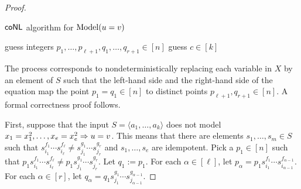 \documentclass{amsart}
\newcommand{\Model}{\mathrm{Model}}
\newcommand{\eq}{\ensuremath\mathrel{=}}
\newcommand{\NL}{\ensuremath\mathsf{NL}}
\newcommand{\co}{\ensuremath\mathsf{co}}
\theoremstyle{remark}
\numberwithin{equation}{section}
\begin{document}
\begin{proof}
  \begin{algorithm}
  \caption{$\co\NL$ algorithm for $\Model(u \eq v)$}
    \label{alg:models}
    \begin{algorithmic}[1]
      \Output{Does $\langle a_1,\dots,a_k,a_1^{-1},\dots,a_k^{-1} \rangle$ \emph{not} model $u \eq v$?}
      \State guess integers $p_1, \dots, p_{\ell+1}, q_1, \dots, q_{r+1} \in [n]$
        \Repeat
          \State guess $c \in [k]$
      \EndFor
      \State\Accept
    \end{algorithmic}
  \end{algorithm}

  The process corresponds to nondeterministically replacing each variable
  in $X$ by an element of $S$ such that the left-hand side and the right-hand
  side of the equation map the point $p_1 = q_1 \in [n]$ to distinct points $p_{\ell+1}, q_{r+1} \in [n]$. A formal correctness proof follows.
  
  First, suppose that the input $S = \langle a_1,\dots,a_k\rangle$ does not model $x_1 \eq x_1^2,\dots,x_e \eq x_e^2 \Rightarrow u \eq v$. This means that there are elements $s_1,\dots,s_m \in S$ such that $s_{i_1}^{f_1}\cdots s_{i_\ell}^{f_\ell} \neq s_{j_1}^{g_1}\cdots s_{j_r}^{g_r}$ and $s_1,\dots,s_e$ are idempotent. Pick a $p_1 \in [n]$ such that $p_1 s_{i_1}^{f_1} \cdots s_{i_\ell}^{f_\ell} \neq p_1 s_{j_1}^{g_1} \cdots s_{j_r}^{g_r}$. Let $q_1 := p_1$. For each $\alpha \in [\ell]$, let $p_\alpha = p_1 s_{i_1}^{f_1} \cdots s_{i_{\alpha-1}}^{f_{\alpha-1}}$. For each $\alpha \in [r]$, let $q_\alpha = q_1 s_{j_1}^{g_1} \cdots s_{j_{\alpha-1}}^{g_{\alpha-1}}$.


\end{proof}
\end{document}
